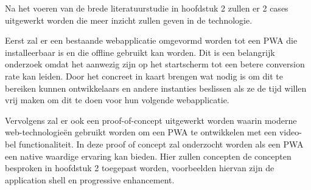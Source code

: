 Na het voeren van de brede literatuurstudie in hoofdstuk 2 zullen er 2 cases uitgewerkt worden die meer inzicht zullen geven in de technologie.


Eerst zal er een bestaande webapplicatie omgevormd worden tot een PWA die installeerbaar is en die offline gebruikt kan worden. Dit is een belangrijk onderzoek omdat het aanwezig zijn op het startscherm tot een betere conversion rate kan leiden. Door het concreet in kaart brengen wat nodig is om dit te bereiken kunnen ontwikkelaars en andere instanties beslissen als ze de tijd willen vrij maken om dit te doen voor hun volgende webapplicatie.


Vervolgens zal er ook een proof-of-concept uitgewerkt worden waarin moderne web-technologieën gebruikt worden om een PWA te ontwikkelen met een video-bel functionaliteit. In deze proof of concept zal onderzocht worden als een PWA een native waardige ervaring kan bieden. Hier zullen concepten de concepten besproken in hoofdstuk 2 toegepast worden, voorbeelden hiervan zijn de application shell en  progressive enhancement.






